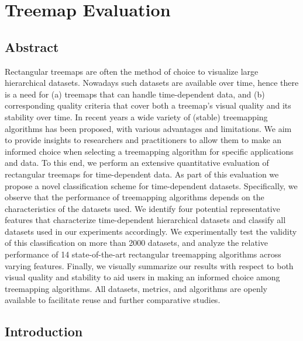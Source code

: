 \chapter{Treemap Evaluation}


\newcommand{\mypar}[1]{\smallskip\noindent{\bfseries #1.}}




\section{Abstract}
Rectangular treemaps are often the method of choice to visualize large hierarchical datasets. Nowadays such datasets are available over time, hence there is a need for (a) treemaps that can handle time-dependent data, and (b) corresponding quality criteria that cover both a treemap's visual quality and its stability over time.
%
In recent years a wide variety of (stable) treemapping algorithms has been proposed, with various advantages and limitations. 
We aim to provide insights to researchers and practitioners to allow them to make an informed choice when selecting a treemapping algorithm for specific applications and data. To this end, we perform an extensive quantitative evaluation of rectangular treemaps for time-dependent data.
%
As part of this evaluation we propose a novel classification scheme for time-dependent datasets. Specifically, we observe that the performance of treemapping algorithms depends on the characteristics of the datasets used. We identify four potential representative features that characterize time-dependent hierarchical datasets and classify all datasets used in our experiments accordingly. We experimentally test the validity of this classification on more than 2000 datasets, and analyze the relative performance of 14 state-of-the-art rectangular treemapping algorithms across varying features. Finally, we visually summarize our results with respect to both visual quality and stability to aid users in making an informed choice among treemapping algorithms.
All datasets, metrics, and algorithms are openly available to facilitate reuse and further comparative studies.

\section{Introduction}
\label{sec:introduction}

